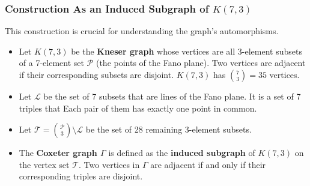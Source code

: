 \documentclass[12pt,a4paper,openany]{book}
\begin{document}
\subsubsection*{Construction As an Induced Subgraph of $K(7,3)$}

This construction is crucial for understanding the graph's automorphisms.
\begin{itemize}
    \item Let $K(7,3)$ be the \textbf{Kneser graph} whose vertices are all 3-element subsets of a 7-element set $\mathcal{P}$ (the points of the Fano plane). Two vertices are adjacent if their corresponding subsets are disjoint. $K(7,3)$ has $\binom{7}{3}=35$ vertices.
    \item Let $\mathcal{L}$ be the set of 7 subsets that are lines of the Fano plane. It is a set of 7 triples that Each pair of them has exactly one point in common.
    \item Let $\mathcal{T} = \binom{\mathcal{P}}{3} \setminus \mathcal{L}$ be the set of 28 remaining 3-element subsets.
    \item The \textbf{Coxeter graph $\Gamma$} is defined as the \textbf{induced subgraph} of $K(7,3)$ on the vertex set $\mathcal{T}$. Two vertices in $\Gamma$ are adjacent if and only if their corresponding triples are disjoint.
\end{itemize}



\end{document}
